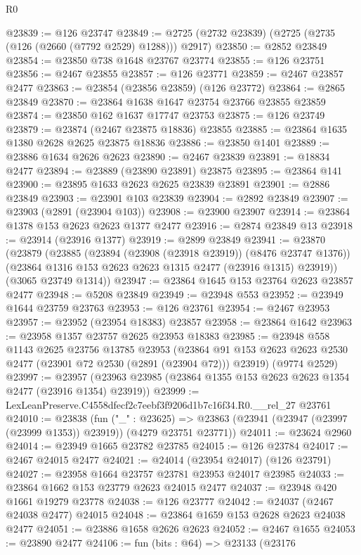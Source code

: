 \begin{lexlean}{R0}
\begin{coremodule}
@23839 := @126 @23747
@23849 := @2725 (@2732 @23839) (@2725 (@2735 (@126 (@2660 (@7792 @2529) @1288))) @2917)
@23850 := @2852 @23849
@23854 := @23850 @738 @1648 @23767 @23774
@23855 := @126 @23751
@23856 := @2467 @23855
@23857 := @126 @23771
@23859 := @2467 @23857 @2477
@23863 := @23854 (@23856 @23859) (@126 @23772)
@23864 := @2865 @23849
@23870 := @23864 @1638 @1647 @23754 @23766 @23855 @23859
@23874 := @23850 @162 @1637 @17747 @23753
@23875 := @126 @23749
@23879 := @23874 (@2467 @23875 @18836) @23855
@23885 := @23864 @1635 @1380 @2628 @2625 @23875 @18836
@23886 := @23850 @1401
@23889 := @23886 @1634 @2626 @2623
@23890 := @2467 @23839
@23891 := @18834 @2477
@23894 := @23889 (@23890 @23891) @23875
@23895 := @23864 @141
@23900 := @23895 @1633 @2623 @2625 @23839 @23891
@23901 := @2886 @23849
@23903 := @23901 @103 @23839
@23904 := @2892 @23849
@23907 := @23903 (@2891 (@23904 @103))
@23908 := @23900 @23907
@23914 := @23864 @1378 @153 @2623 @2623 @1377 @2477
@23916 := @2874 @23849 @13
@23918 := @23914 (@23916 @1377)
@23919 := @2899 @23849
@23941 := @23870
    (@23879
      (@23885
        (@23894 (@23908 (@23918 @23919)) (@8476 @23747 @1376))
        (@23864 @1316 @153 @2623 @2623 @1315 @2477 (@23916 @1315) @23919))
      (@3065 @23749 @1314))
@23947 := @23864 @1645 @153 @23764 @2623 @23857 @2477
@23948 := @5208 @23849
@23949 := @23948 @553
@23952 := @23949 @1644 @23759 @23763
@23953 := @126 @23761
@23954 := @2467 @23953
@23957 := @23952 (@23954 @18383) @23857
@23958 := @23864 @1642
@23963 := @23958 @1357 @23757 @2625 @23953 @18383
@23985 := @23948
    @558
    @1143
    @2625
    @23756
    @13785
    @23953
    (@23864 @91 @153 @2623 @2623 @2530 @2477 (@23901 @72 @2530 (@2891 (@23904 @72))) @23919)
    (@9774 @2529)
@23997 := @23957 (@23963 @23985 (@23864 @1355 @153 @2623 @2623 @1354 @2477 (@23916 @1354) @23919))
@23999 := LexLeanPreserve.C4558dfecf2c7eebf3f9206d1b7c16f34.R0.__rel_27 @23761
@24010 := @23838
    (fun ("_" : @23625) =>
    @23863 (@23941 (@23947 (@23997 (@23999 @1353)) @23919)) (@4279 @23751 @23771))
@24011 := @23624 @2960
@24014 := @23949 @1665 @23782 @23785
@24015 := @126 @23784
@24017 := @2467 @24015 @2477
@24021 := @24014 (@23954 @24017) (@126 @23791)
@24027 := @23958 @1664 @23757 @23781 @23953 @24017 @23985
@24033 := @23864 @1662 @153 @23779 @2623 @24015 @2477
@24037 := @23948 @420 @1661 @19279 @23778
@24038 := @126 @23777
@24042 := @24037 (@2467 @24038 @2477) @24015
@24048 := @23864 @1659 @153 @2628 @2623 @24038 @2477
@24051 := @23886 @1658 @2626 @2623
@24052 := @2467 @1655
@24053 := @23890 @2477
@24106 := fun (bits : @64) =>
  @23133
    (@23176

\end{coremodule}
\end{lexlean}
